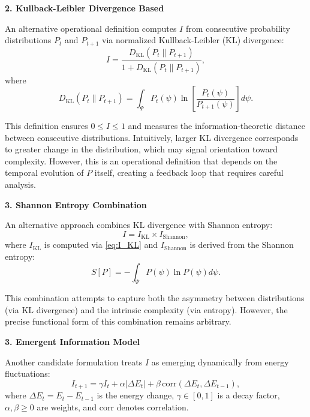 \documentclass[12pt,a4paper]{article}
\theoremstyle{definition}
\theoremstyle{remark}
\begin{document}
\textbf{2. Kullback-Leibler Divergence Based}

An alternative operational definition computes $I$ from consecutive probability distributions $P_t$ and $P_{t+1}$ via normalized Kullback-Leibler (KL) divergence:
\begin{equation}\label{eq:I_KL}
I = \frac{D_{\mathrm{KL}}(P_t \parallel P_{t+1})}{1 + D_{\mathrm{KL}}(P_t \parallel P_{t+1})},
\end{equation}
where
\begin{equation}
D_{\mathrm{KL}}(P_t \parallel P_{t+1}) = \int_\Psi P_t(\psi) \ln\left[\frac{P_t(\psi)}{P_{t+1}(\psi)}\right] d\psi.
\end{equation}

This definition ensures $0 \leq I \leq 1$ and measures the information-theoretic distance between consecutive distributions. Intuitively, larger KL divergence corresponds to greater change in the distribution, which may signal orientation toward complexity. However, this is an operational definition that depends on the temporal evolution of $P$ itself, creating a feedback loop that requires careful analysis.

\textbf{3. Shannon Entropy Combination}

An alternative approach combines KL divergence with Shannon entropy:
\begin{equation}
I = I_{\mathrm{KL}} \times I_{\mathrm{Shannon}},
\end{equation}
where $I_{\mathrm{KL}}$ is computed via \eqref{eq:I_KL} and $I_{\mathrm{Shannon}}$ is derived from the Shannon entropy:
\begin{equation}
S[P] = -\int_\Psi P(\psi) \ln P(\psi) d\psi.
\end{equation}

This combination attempts to capture both the asymmetry between distributions (via KL divergence) and the intrinsic complexity (via entropy). However, the precise functional form of this combination remains arbitrary.

\textbf{3. Emergent Information Model}

Another candidate formulation treats $I$ as emerging dynamically from energy fluctuations:
\begin{equation}\label{eq:I_emergent}
I_{t+1} = \gamma I_t + \alpha |\Delta E_t| + \beta \, \mathrm{corr}(\Delta E_t, \Delta E_{t-1}),
\end{equation}
where $\Delta E_t = E_t - E_{t-1}$ is the energy change, $\gamma \in [0,1]$ is a decay factor, $\alpha, \beta \geq 0$ are weights, and $\mathrm{corr}$ denotes correlation.
\end{document}
